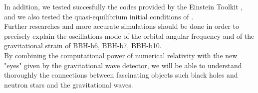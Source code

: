 In addition, we tested succesfully the codes provided by the Einstein Toolkit \cite{EinsteinToolkit:web}, and we also tested the quasi-equilibrium initial conditions of \cite{tichy_quasi-equilibrium_2004}.\\
Further researches and more accurate simulations should be done in order to precisely explain the oscillations mode of the orbital angular frequency and of the gravitational strain of BBH-b6, BBH-b7, BBH-b10.\\
By combining the computational power of numerical relativity with the new "eyes" given by the gravitational wave detector, we will be able to understand thoroughly the connections between fascinating objects such black holes and neutron stars and the gravitational waves.




